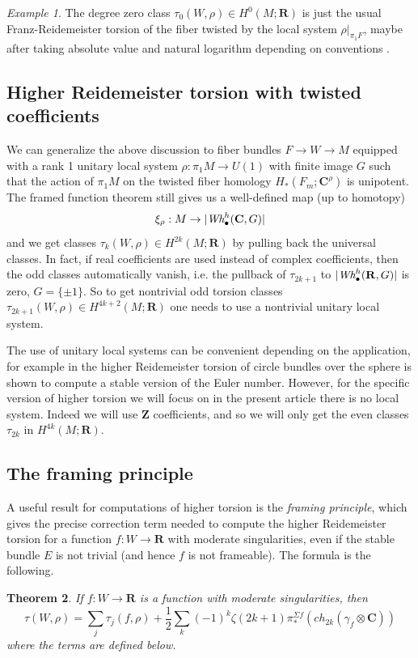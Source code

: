 \documentclass{amsart}
\def\bC{\mathbf{C}}
\def\bR{\mathbf{R}}
\def\bZ{\mathbf{Z}}
\newtheorem{theorem}{Theorem}[section]
\theoremstyle{definition}
\theoremstyle{remark}
\newtheorem{example}[theorem]{Example}
\newtheorem{inductive lemma}[theorem]{Inductive Lemma}
\begin{document}
\begin{example} The degree zero class $\tau_0(W,\rho)  \in H^0(M;\bR)$ is just the usual Franz-Reidemeister torsion of the fiber twisted by the local system $\rho|_{\pi_1 F}$, maybe after taking absolute value and natural logarithm depending on conventions \cite{F35,R35}.  \end{example} 
 

 
\subsection{Higher Reidemeister torsion with twisted coefficients}\label{ss: higher torsion with G coef} %

We can generalize the above discussion to fiber bundles $F \to W \to M$ equipped with a rank 1 unitary local system $\rho: \pi_1 M \to U(1)$ with finite image $G$ such that the action of $\pi_1 M$ on the twisted fiber homology $H_*(F_m;\bC^\rho)$ is unipotent.  The framed function theorem still gives us a well-defined map (up to homotopy)
 $$\xi_\rho: M \to |\text{\em Wh}_\bullet^h(\bC,G)| $$
 and we get classes $\tau_k(W,\rho)\in H^{2k}(M;\bR)$ by pulling back the universal classes. In fact, if real coefficients are used instead of complex coefficients, then the odd classes automatically vanish, i.e. the pullback of $\tau_{2k+1}$ to $|\text{\em Wh}_\bullet^h(\bR,G)|$ is zero, $G=\{\pm1\}$. So to get nontrivial odd torsion classes $\tau_{2k+1}(W,\rho)\in H^{4k+2}(M;\bR)$ one needs to use a nontrivial unitary local system. 
 
 The use of unitary local systems can be convenient depending on the application, for example in \cite{AI} the higher Reidemeister torsion of circle bundles over the sphere is shown to compute a stable version of the Euler number. However, for the specific version of higher torsion we will focus on in the present article there is no local system. Indeed we will use $\bZ$ coefficients, and so we will only get the even classes $\tau_{2k}$ in $H^{4k}(M;\bR)$.  
 
\subsection{The framing principle}\label{ss:FramingPrinciple} %

A useful result for computations of higher torsion is the {\em framing principle}, which gives the precise correction term needed to compute the higher Reidemeister torsion for a function $f:W \to \bR$ with moderate singularities, even if the stable bundle $E$ is not trivial (and hence $f$ is not frameable). The formula \cite[Theorem 4.11]{I02} is the following.
\begin{theorem}\label{thm: framing} If  $f:W \to \bR$ is a function with moderate singularities, then
\begin{equation}\label{eq:FramingPrinciple}
\tau(W,\rho)=\sum_j\tau_j(f,\rho)+ \frac12 \sum_k (-1)^k \zeta(2k+1) \pi_\ast^{\Sigma f} \left( ch_{2k}(\gamma_f\otimes\bC)\right) 
\end{equation}
where the terms are defined below.
\end{theorem}
\end{document}
